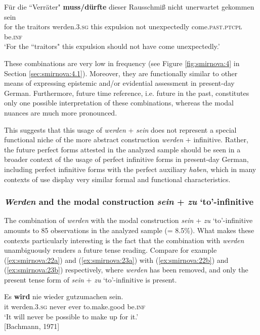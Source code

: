 \documentclass[output=paper,colorlinks,citecolor=brown]{langscibook}
\begin{document}
\ex \label{ex:smirnova:21b}
\gll Für die ``Verräter" \textbf{muss/dürfte} dieser Rausschmiß nicht unerwartet gekommen sein \\
for the traitors werden.\textsc{3.sg} this expulsion not unexpectedly come.\textsc{past.ptcpl} be.\textsc{inf} \\
\glt `For the ``traitors" this expulsion should not have come unexpectedly.'
    \z
\z

These combinations are very low in frequency (see Figure \ref{fig:smirnova:4} in Section \ref{sec:smirnova:4.1}). Moreover, they are functionally similar to other means of expressing epistemic and/or evidential assessment in present-day German. Furthermore, future time reference, i.e. future in the past, constitutes only one possible interpretation of these combinations, whereas the modal nuances are much more pronounced. 
\par This suggests that this usage of \emph{werden} + \emph{sein} does not represent a special functional niche of the more abstract construction \emph{werden} + infinitive. Rather, the future perfect forms attested in the analyzed sample should be seen in a broader context of the usage of perfect infinitive forms in present-day German, including perfect infinitive forms with the perfect auxiliary \emph{haben}, which in many contexts of use display very similar formal and functional characteristics.

\largerpage[-2]

\subsubsection{\emph{Werden} and the modal construction \emph{sein} + \emph{zu} `to'-infinitive} \label{sec:smirnova:4.2.2}
The combination of \emph{werden} with the modal construction \emph{sein} + \emph{zu} `to'-infinitive amounts to 85 observations in the analyzed sample (= 8.5\%). What makes these contexts particularly interesting is the fact that the combination with \emph{werden} unambiguously renders a future tense reading. Compare for example (\ref{ex:smirnova:22a}) and (\ref{ex:smirnova:23a}) with (\ref{ex:smirnova:22b}) and (\ref{ex:smirnova:23b}) respectively, where \emph{werden} has been removed, and only the present tense form of \emph{sein} + \emph{zu} `to'-infinitive is present.

\ea \label{ex:smirnova:22}
\ea\label{ex:smirnova:22a}
\gll Es \textbf{wird} nie wieder gutzumachen sein. \\
    it werden.\textsc{3.sg} never ever {to.make.good} be.\textsc{inf} \\
\glt `It will never be possible to make up for it.'\\
\hfill [Bachmann, 1971]
\end{document}
